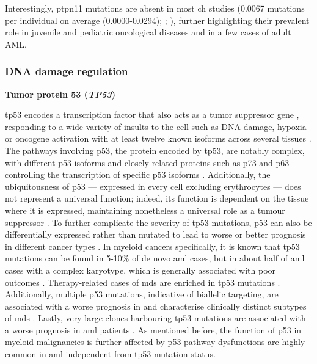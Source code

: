 Interestingly, \ac{ptpn11} mutations are absent in most \ac{ch} studies \cite{Jaiswal2014-rl,Genovese2014-eu,Zink2017-zi,Bolton2020-ct,Coombs2017-ph,Acuna-Hidalgo2017-ng,Young2016-du,Young2019-rz} (0.0067 mutations per individual on average (0.0000-0.0294); ; ), further highlighting their prevalent role in juvenile and pediatric oncological diseases and in a few cases of adult AML.

\subsubsection{DNA damage regulation}

\noindent \textbf{Tumor protein 53 (\textit{TP53})}

\Ac{tp53} encodes a transcription factor that also acts as a tumor suppressor gene \cite{Surget2013-xh}, responding to a wide variety of insults to the cell such as DNA damage, hypoxia or oncogene activation \cite{Oren2003-gg} with at least twelve known isoforms across several tissues \cite{Khoury2011-yk,Bourdon2005-ne}. The pathways involving p53, the protein encoded by \ac{tp53}, are notably complex, with different p53 isoforms and closely related proteins such as p73 and p63 controlling the transcription of specific p53 isoforms \cite{Bourdon2005-ne}. Additionally, the ubiquitousness of p53 --- expressed in every cell excluding erythrocytes --- does not represent a universal function; indeed, its function is dependent on the tissue where it is expressed, maintaining nonetheless a universal role as a tumour suppressor \cite{Surget2013-xh}. To further complicate the severity of \ac{tp53} mutations, p53 can also be differentially expressed rather than mutated to lead to worse or better prognosis in different cancer types \cite{Bourdon2011-hc,Song2009-oq,Surget2013-xh}. In myeloid cancers specifically, it is known that \ac{tp53} mutations can be found in 5-10\% of de novo \ac{aml} cases, but in about half of \ac{aml} cases with a complex karyotype, which is generally associated with poor outcomes \cite{Hou2015-jz,Rucker2012-oj,Bowen2009-ep}. Therapy-related cases of \ac{mds} are enriched in \ac{tp53} mutations \cite{Wong2015-ki}. Additionally, multiple p53 mutations, indicative of biallelic targeting, are associated with a worse prognosis in and characterise clinically distinct subtypes of \ac{mds} \cite{Bernard2020-fj}. Lastly, very large clones harbouring \ac{tp53} mutations are associated with a worse prognosis in \ac{aml} patients \cite{Short2020-qu}. As mentioned before, the function of p53 in myeloid malignancies is further affected by p53 pathway dysfunctions are highly common in \ac{aml} \cite{Quintas-Cardama2017-tj,Abramowitz2017-lg} independent from \ac{tp53} mutation status.

